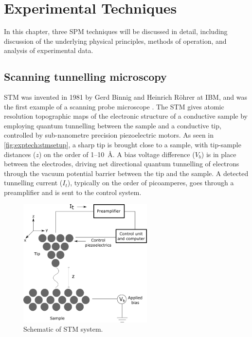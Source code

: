 
\chapter{Experimental Techniques}
\label{ch:exptech}

In this chapter, three \acf{SPM} techniques will be discussed in detail, including discussion of the underlying physical principles, methods of operation, and analysis of experimental data.



\section{Scanning tunnelling microscopy}

\Acf{STM} was invented in 1981 by Gerd Binnig and Heinrich R\"ohrer at IBM, and was the first example of a scanning probe microscope \citep{binnig1982surface}. The \ac{STM} gives atomic resolution topographic maps of the electronic structure of a conductive sample by employing quantum tunnelling between the sample and a conductive tip, controlled by sub-nanometre precision piezoelectric motors. As seen in \autoref{fig:exptech:stmsetup}, a sharp tip is brought close to a sample, with tip-sample distances ($z$) on the order of 1--\SI{10}{\angstrom}. A bias voltage difference ($V_b$) is in place between the electrodes, driving net directional quantum tunnelling of electrons through the vacuum potential barrier between the tip and the sample. A detected tunnelling current ($I_t$), typically on the order of picoamperes, goes through a preamplifier and is sent to the control system.

\begin{figure} [h]
    \centering
    \includegraphics[width=0.6\textwidth]{pictures/stm_diagram.png}
    \caption{Schematic of STM system.}
    \label{fig:exptech:stmsetup}
\end{figure}

